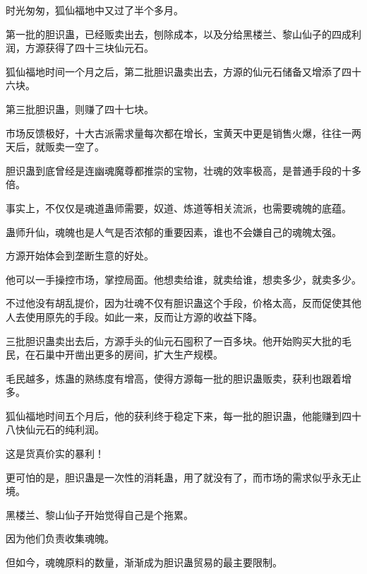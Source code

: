 \begin{this_body}
时光匆匆，狐仙福地中又过了半个多月。

第一批的胆识蛊，已经贩卖出去，刨除成本，以及分给黑楼兰、黎山仙子的四成利润，方源获得了四十三块仙元石。

狐仙福地时间一个月之后，第二批胆识蛊卖出去，方源的仙元石储备又增添了四十六块。

第三批胆识蛊，则赚了四十七块。

市场反馈极好，十大古派需求量每次都在增长，宝黄天中更是销售火爆，往往一两天后，就贩卖一空了。

胆识蛊到底曾经是连幽魂魔尊都推崇的宝物，壮魂的效率极高，是普通手段的十多倍。

事实上，不仅仅是魂道蛊师需要，奴道、炼道等相关流派，也需要魂魄的底蕴。

蛊师升仙，魂魄也是人气是否浓郁的重要因素，谁也不会嫌自己的魂魄太强。

方源开始体会到垄断生意的好处。

他可以一手操控市场，掌控局面。他想卖给谁，就卖给谁，想卖多少，就卖多少。

不过他没有胡乱提价，因为壮魂不仅有胆识蛊这个手段，价格太高，反而促使其他人去使用原先的手段。如此一来，反而让方源的收益下降。

三批胆识蛊卖出去后，方源手头的仙元石囤积了一百多块。他开始购买大批的毛民，在石巢中开凿出更多的房间，扩大生产规模。

毛民越多，炼蛊的熟练度有增高，使得方源每一批的胆识蛊贩卖，获利也跟着增多。

狐仙福地时间五个月后，他的获利终于稳定下来，每一批的胆识蛊，他能赚到四十八快仙元石的纯利润。

这是货真价实的暴利！

更可怕的是，胆识蛊是一次性的消耗蛊，用了就没有了，而市场的需求似乎永无止境。

黑楼兰、黎山仙子开始觉得自己是个拖累。

因为他们负责收集魂魄。

但如今，魂魄原料的数量，渐渐成为胆识蛊贸易的最主要限制。

\end{this_body}


